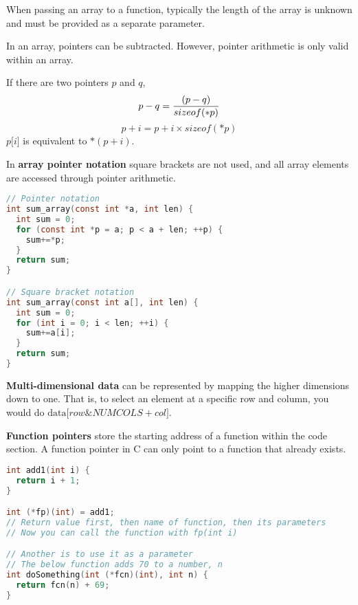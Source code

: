 \documentclass[english, 12pt]{article}
\begin{document}
\begin{qte}
When passing an array to a function, typically the length of the array is unknown and must be provided as a separate parameter.
\end{qte}

\begin{qte}
In an array, pointers can be subtracted. However, pointer arithmetic is only valid within an array.
\end{qte}

\begin{note}
If there are two pointers $p$ and $q$,
\[p-q = \frac{(p-q)}{sizeof(*p)}\]
\[p + i = p + i \times sizeof(*p)\]
$p\lbrack i \rbrack $ is equivalent to $*(p + i)$.
\end{note}

\begin{exmp}
In \textbf{array pointer notation} square brackets are not used, and all array elements are accessed through pointer arithmetic.

\begin{lstlisting}[language=C]
// Pointer notation
int sum_array(const int *a, int len) {
  int sum = 0;
  for (const int *p = a; p < a + len; ++p) {
    sum+=*p;
  }
  return sum;
}

// Square bracket notation
int sum_array(const int a[], int len) {
  int sum = 0;
  for (int i = 0; i < len; ++i) {
    sum+=a[i];
  }
  return sum;
}
\end{lstlisting}
\end{exmp}

\begin{defn}
\textbf{Multi-dimensional data} can be represented by mapping the higher dimensions down to one. That is, to select an element at a specific row and column, you would do $\text{data}\lbrack row \& NUMCOLS + col \rbrack$.
\end{defn}

\begin{defn}
\textbf{Function pointers} store the starting address of a function within the code section. A function pointer in C can only point to a function that already exists.
\begin{lstlisting}[language=C]
int add1(int i) {
  return i + 1;
}

int (*fp)(int) = add1;
// Return value first, then name of function, then its parameters
// Now you can call the function with fp(int i)

// Another is to use it as a parameter
// The below function adds 70 to a number, n
int doSomething(int (*fcn)(int), int n) {
  return fcn(n) + 69;
}
\end{lstlisting}
\end{defn}
\end{document}
